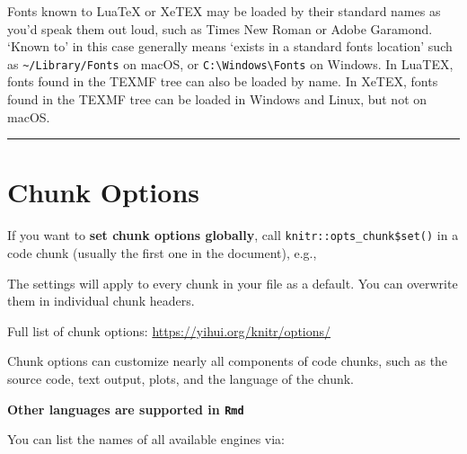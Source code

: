 \documentclass[
  a4paper,
  twoside,
  openright]{book}
\newenvironment{Shaded}{\begin{snugshade}}{\end{snugshade}}
\newcommand{\InformationTok}[1]{\textcolor[rgb]{0.56,0.35,0.01}{\textbf{\textit{#1}}}}
\theoremstyle{definition}
\theoremstyle{definition}
\theoremstyle{definition}
\theoremstyle{definition}
\theoremstyle{remark}
\begin{document}
Fonts known to LuaTeX or XeTEX may be loaded by their standard names as you'd speak them out loud, such as Times New Roman or Adobe Garamond. `Known to' in this case generally means `exists in a standard fonts location' such as \texttt{\textasciitilde{}/Library/Fonts} on macOS, or \texttt{C:\textbackslash{}Windows\textbackslash{}Fonts} on Windows. In LuaTEX, fonts found in the TEXMF tree can also be loaded by name. In XeTEX, fonts found in the TEXMF tree can be loaded in Windows and Linux, but not on macOS.

\begin{center}\rule{0.5\linewidth}{0.5pt}\end{center}

\section{Chunk Options}\label{chunk-options}

If you want to \textbf{set chunk options globally}, call \texttt{knitr::opts\_chunk\$set()} in a code chunk (usually the first one in the document), e.g.,

\begin{Shaded}
\end{Shaded}

The settings will apply to every chunk in your file as a default. You can overwrite them in individual chunk headers.

Full list of chunk options: \url{https://yihui.org/knitr/options/}

Chunk options can customize nearly all components of code chunks, such as the source code, text output, plots, and the language of the chunk.

\textbf{Other languages are supported in \texttt{Rmd}}

You can list the names of all available engines via:
\end{document}
